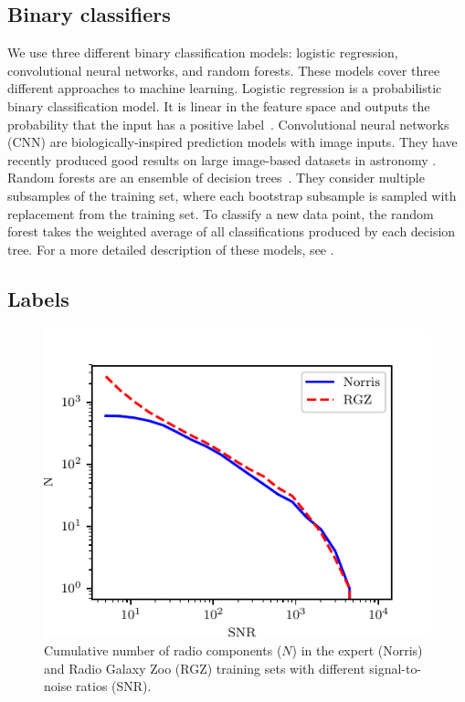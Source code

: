   \subsection{Binary classifiers}\label{sec:atlas-xid-classifiers}

    We use three different binary classification models: logistic regression,
    convolutional neural networks, and random forests. These models cover
    three different approaches to machine learning. Logistic regression is a
    probabilistic binary classification model. It is linear in the feature
    space and outputs the probability that the input has a positive
    label~\citep[Chap. 4]{bishop06ml}. Convolutional neural networks (CNN) are
    biologically-inspired prediction models with image inputs.
    They have recently produced good results on large image-based datasets in
    astronomy \citep[e.g.]{lukic18compact, dieleman15cnn}. Random
    forests are an ensemble of decision trees~\citep{breiman01random-forest}.
    They consider multiple subsamples of the training set, where each
    bootstrap subsample is sampled with replacement from the training set. To
    classify a new data point, the random forest takes the weighted average of
    all classifications produced by each decision tree. For a more detailed description of these models, see .

  \subsection{Labels}\label{sec:atlas-xid-labels}

    \begin{figure}
      \centering
      \includegraphics[width=0.6\columnwidth]{atlas-images/snr_cutoff_cumulative.pdf}
      \caption[Cumulative number of radio components in the expert and Radio Galaxy
        Zoo training sets with different signal-to-noise ratios.]{Cumulative number of radio components ($N$) in the expert (Norris) and Radio Galaxy
        Zoo (RGZ) training sets with different signal-to-noise ratios (SNR).}
      \label{fig:distribution-cutoffs}
    \end{figure}

